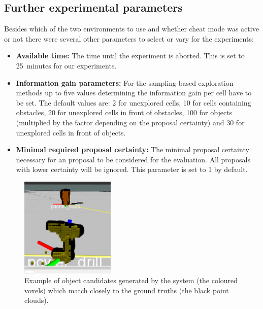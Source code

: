 \documentclass[a4paper,11pt,english]{article}
\begin{document}
\subsection{Further experimental parameters}
Besides which of the two environments to use and whether cheat mode was active or not there were several other parameters to select or vary for the experiments:

\begin{itemize}
	\item \textbf{Available time:} The time until the experiment is aborted. This is set to \num{25}~minutes for our experiments.
	\item \textbf{Information gain parameters:} For the sampling-based exploration methods up to five values determining the information gain per cell have to be set. The default values are: \num{2} for unexplored cells, \num{10} for cells containing obstacles, \num{20} for unexplored cells in front of obstacles, \num{100} for objects (multiplied by the factor depending on the proposal certainty) and \num{30} for unexplored cells in front of objects.
	\item \textbf{Minimal required proposal certainty:} The minimal proposal certainty necessary for an proposal to be considered for the evaluation. All proposals with lower certainty will be ignored. This parameter is set to \num{1} by default.
\end{itemize}

\begin{figure}[h]
	\begin{center}
		\includegraphics[width=0.4\textwidth]{src/drill2.png}
		\caption{Example of object candidates generated by the system (the coloured voxels) which match closely to the ground truths (the black point clouds).}
		\label{fig:good_results}
	\end{center}
\end{figure}
\end{document}
